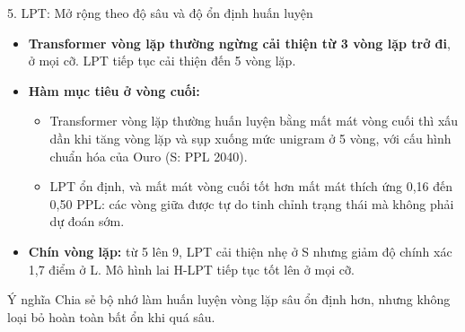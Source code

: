 \begin{frame}{5. LPT: Mở rộng theo độ sâu và độ ổn định huấn luyện}
    \begin{itemize}
        \item \textbf{Transformer vòng lặp thường ngừng cải thiện từ 3 vòng lặp trở đi}, ở mọi cỡ. LPT tiếp tục cải thiện đến 5 vòng lặp.
        \item \textbf{Hàm mục tiêu ở vòng cuối:}
        \begin{itemize}
            \item Transformer vòng lặp thường huấn luyện bằng mất mát vòng cuối thì xấu dần khi tăng vòng lặp và sụp xuống mức unigram ở 5 vòng, với cấu hình chuẩn hóa của Ouro (S: PPL 2040).
            \item LPT ổn định, và mất mát vòng cuối tốt hơn mất mát thích ứng 0,16 đến 0,50 PPL: các vòng giữa được tự do tinh chỉnh trạng thái mà không phải dự đoán sớm.
        \end{itemize}
        \item \textbf{Chín vòng lặp:} từ 5 lên 9, LPT cải thiện nhẹ ở S nhưng giảm độ chính xác 1,7 điểm ở L. Mô hình lai H-LPT tiếp tục tốt lên ở mọi cỡ.
    \end{itemize}
    \begin{block}{Ý nghĩa}
        Chia sẻ bộ nhớ làm huấn luyện vòng lặp sâu ổn định hơn, nhưng không loại bỏ hoàn toàn bất ổn khi quá sâu.
    \end{block}
\end{frame}

